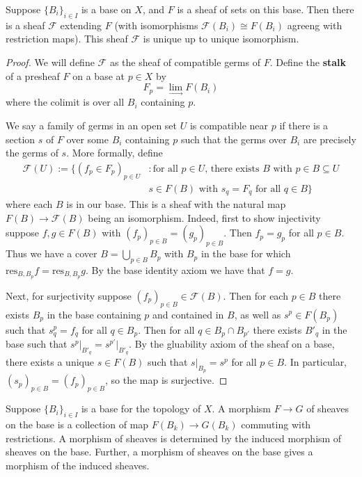 \begin{theorem}
    Suppose $\{B_i\}_{i \in I}$ is a base on $X$, and $F$ is a sheaf of sets on this base. Then there is a sheaf $\mathscr{F}$ extending $F$ (with isomorphisms $\mathscr{F}(B_i)\cong F(B_i)$ agreeng with restriction maps). This sheaf $\mathscr{F}$ is unique up to unique isomorphism.
\end{theorem}
\begin{proof}
    We will define $\mathscr{F}$ as the sheaf of compatible germs of $F$. Define the \textbf{stalk} of a presheaf $F$ on a base at $p \in X$ by $$F_p = \lim\limits_{\rightarrow}F(B_i)$$
    where the colimit is over all $B_i$ containing $p$.

    We say a family of germs in an open set $U$ is compatible near $p$ if there is a section $s$ of $F$ over some $B_i$ containing $p$ such that the germs over $B_i$ are precisely the germs of $s$. More formally, define \begin{align*}
        \mathscr{F}(U) := \{(f_p\in F_p)_{p \in U}&: \text{for all $p \in U$, there exists $B$ with $p \in B \subseteq U$} \\
        &s \in F(B) \text{ with } s_q = F_q\text{ for all }q \in B\}
    \end{align*}
    where each $B$ is in our base. This is a sheaf with the natural map $F(B)\rightarrow \mathscr{F}(B)$ being an isomorphism. Indeed, first to show injectivity suppose $f,g \in F(B)$ with $(f_p)_{p \in B} = (g_p)_{p \in B}$. Then $f_p = g_p$ for all $p \in B$. Thus we have a cover $B = \bigcup_{p \in B}B_p$ with $B_p$ in the base for which $\text{res}_{B,B_p}f = \text{res}_{B,B_p}g$. By the base identity axiom we have that $f = g$.

    Next, for surjectivity suppose $(f_p)_{p \in B} \in \mathscr{F}(B)$. Then for each $p \in B$ there exists $B_p$ in the base containing $p$ and contained in $B$, as well as $s^p \in F(B_p)$ such that $s^p_q = f_q$ for all $q \in B_p$. Then for all $q \in B_p \cap B_{p'}$ there exists $B'_q$ in the base such that $s^p\vert_{B'_q} = s^{p'}\vert_{B'_q}$. By the gluability axiom of the sheaf on a base, there exists a unique $s \in F(B)$ such that $s\vert_{B_p} = s^p$ for all $p \in B$. In particular, $(s_p)_{p \in B} = (f_p)_{p \in B}$, so the map is surjective.
\end{proof}

\begin{theorem}
Suppose $\{B_i\}_{i \in I}$ is a base for the topology of $X$. A morphism $F\rightarrow G$ of sheaves on the base is a collection of map $F(B_k)\rightarrow G(B_k)$ commuting with restrictions. A morphism of sheaves is determined by the induced morphism of sheaves on the base. Further, a morphism of sheaves on the base gives a morphism of the induced sheaves.\end{theorem}

